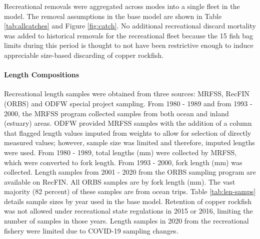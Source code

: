 \documentclass[11pt,
  english,
  a4paper,
]{article}
\begin{document}

Recreational removals were aggregated across modes into a single fleet in the model. The removal assumptions in the base model are shown in Table \ref{tab:allcatches} and Figure \ref{fig:catch}. No additional recreational discard mortality was added to historical removals for the recreational fleet because the 15 fish bag limits during this period is thought to not have been restrictive enough to induce appreciable size-based discarding of copper rockfish.

\leavevmode\tagmcend\tagstructend\par


\hypertarget{length-compositions}{%
\paragraph{Length Compositions}\label{length-compositions}}

\leavevmode\tagmcend\tagstructend


Recreational length samples were obtained from three sources: MRFSS, RecFIN (ORBS) and ODFW special project sampling. From 1980 - 1989 and from 1993 - 2000, the MRFSS program collected samples from both ocean and inland (estuary) areas. ODFW provided MRFSS samples with the addition of a column that flagged length values imputed from weights to allow for selection of directly measured values; however, sample size was limited and therefore, imputed lengths were used. From 1980 - 1989, total lengths (mm) were collected by MRFSS, which were converted to fork length. From 1993 - 2000, fork length (mm) was collected. Length samples from 2001 - 2020 from the ORBS sampling program are available on RecFIN. All ORBS samples are by fork length (mm). The vast majority (82 percent) of these samples are from ocean trips. Table \ref{tab:len-samps} details sample sizes by year used in the base model. Retention of copper rockfish was not allowed under recreational state regulations in 2015 or 2016, limiting the number of samples in those years. Length samples in 2020 from the recreational fishery were limited due to COVID-19 sampling changes.

\leavevmode\tagmcend\tagstructend\par

\end{document}
